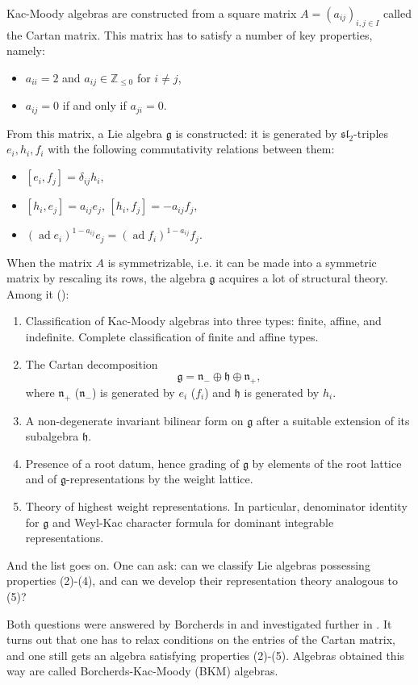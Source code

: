 \documentclass[11pt]{amsart}
\renewcommand{\le}{\leqslant}
\newcommand{\Z}{\mathbb{Z}}
\newcommand{\n}{\mathfrak{n}}
\newcommand{\g}{\mathfrak{g}}
\newcommand{\h}{\mathfrak{h}}
\renewcommand{\sl}{\mathfrak{sl}}
\numberwithin{equation}{section}
\theoremstyle{plain}
\theoremstyle{definition}
\begin{document}
Kac-Moody algebras are constructed from a square matrix $A=(a_{ij})_{i,j\in I}$ called the Cartan matrix. This matrix has to satisfy a number of key properties, namely:
\begin{itemize}
    \item $a_{ii}=2$ and $a_{ij}\in\Z_{\le 0}$ for $i\ne j$,
    \item $a_{ij}=0$ if and only if $a_{ji}=0$.
\end{itemize}
From this matrix, a Lie algebra $\g$ is constructed: it is generated by $\sl_2$-triples $e_i,h_i,f_i$ with the following commutativity relations between them:
\begin{itemize}
    \item $[e_i,f_j]=\delta_{ij}h_i$,
    \item $[h_i,e_j]=a_{ij}e_j$, $[h_i,f_j]=-a_{ij}f_j$,
    \item $(\operatorname{ad}e_i)^{1-a_{ij}}e_j=(\operatorname{ad}f_i)^{1-a_{ij}}f_j$.
\end{itemize}

When the matrix $A$ is symmetrizable, i.e. it can be made into a symmetric matrix by rescaling its rows, the algebra $\g$ acquires a lot of structural theory. Among it (\cite{Kac90}):
\begin{enumerate}
    \item Classification of Kac-Moody algebras into three types: finite, affine, and indefinite. Complete classification of finite and affine types.
    \item The Cartan decomposition
    $$
    \g=\n_-\oplus\h\oplus\n_+,
    $$
    where $\n_+$ ($\n_-$) is generated by $e_i$ ($f_i$) and $\h$ is generated by $h_i$.
    \item A non-degenerate invariant bilinear form on $\g$ after a suitable extension of its subalgebra $\h$.
    \item Presence of a root datum, hence grading of $\g$ by elements of the root lattice and of $\g$-representations by the weight lattice.
    \item Theory of highest weight representations. In particular, denominator identity for $\g$ and Weyl-Kac character formula for dominant integrable representations.
\end{enumerate}
And the list goes on. One can ask: can we classify Lie algebras possessing properties (2)-(4), and can we develop their representation theory analogous to (5)? 

Both questions were answered by Borcherds in \cite{Bor88} and investigated further in \cite{Jur96,Jur98}. It turns out that one has to relax conditions on the entries of the Cartan matrix, and one still gets an algebra satisfying properties (2)-(5). Algebras obtained this way are called Borcherds-Kac-Moody (BKM) algebras.
\end{document}
